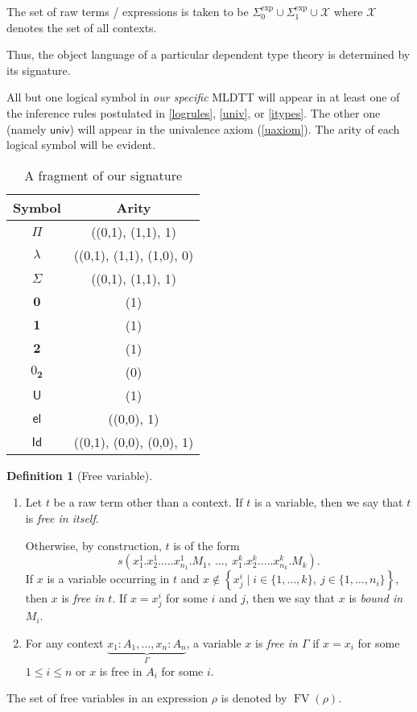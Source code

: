 \documentclass[10pt,letterpaper,cm]{nupset}
\theoremstyle{definition}
\newtheorem{definition}{Definition}[subsection]
\theoremstyle{theorem}
\theoremstyle{remark}
\newcommand{\id}{\mathsf{Id}}
\newcommand{\U}{\mathsf{U}}
\newcommand{\el}{\mathsf{el}}
\newcommand{\univv}{\mathsf{univ}}
\newcommand{\0}{\mathbf{0}}
\newcommand{\1}{\mathbf{1}}
\newcommand{\2}{\mathbf{2}}
\DeclareMathOperator{\fv}{FV}
\DeclareMathOperator{\expr}{exp}
\newcommand{\be}{\begin{enumerate}}
\newcommand{\ee}{\end{enumerate}}
\begin{document}
\medskip
The set of raw terms / expressions is taken to be $\Sigma_0^{\expr} \cup \Sigma_1^{\expr} \cup \mathcal{X}$ where $\mathcal{X}$ denotes the set of all contexts. 

\medskip

 Thus, the object language of a particular dependent type theory is determined by its signature. 
 \smallskip
 
 All but one logical symbol in \emph{our specific} MLDTT will appear in at least one of the inference rules postulated in \cref{logrules}, \cref{univ}, or \cref{itypes}. The other one (namely $\univv$) will appear in the univalence axiom (\cref{uaxiom}). The arity of each logical symbol will be evident. 

\begin{table}[h!]
\centering
\caption{A fragment of our signature}
\label{table:1}
\begin{tabular}{||c c||} 
 \hline
Symbol & Arity \\ [0.5ex] 
 \hline\hline
 $\Pi$ & ((0,1), (1,1), 1) \\
 $ \lambda$ &  ((0,1), (1,1), (1,0), 0) \\
  $\Sigma$ & ((0,1), (1,1), 1) \\
   $\0$ & (1) \\
 $\1$ & (1) \\ 
  $\2$ & (1) \\ 
   $0_{\2}$ & (0) \\  
 $\U$ & (1) \\ 
 $\el$ & ((0,0), 1) \\
 $\id$ & ((0,1), (0,0), (0,0), 1) \\ [1ex] 
 \hline
\end{tabular}
\end{table}

\begin{definition}[Free variable] $ $
\be
\item Let $t$ be a raw term other than a context. If $t$ is a variable, then we say that $t$ is \textit{free in itself}. 

Otherwise, by construction, $t$ is of the form  $$s\left(x^1_1.x^1_2.\ldots.x^1_{n_1}.M_{1},\ \ldots,\  x^k_1.x^k_2.\ldots.x^k_{n_k}.M_{k}\right)  .$$  If $x$ is a variable occurring in $t$ and $x\notin \left\{x_j^i \mid i\in \{1, \ldots, k\},\ j\in \{1, \ldots, n_i\}\right\}$, then $x$ is \textit{free in $t$}. 
If $x = x_j^i$ for some $i$ and $j$, then we say that $x$ is \textit{bound in $M_i$}.
\item For any context $\underbrace{x_1:A_1, \ldots, x_n :A_n}_{\Gamma}$, a variable $x$ is \textit{free in $\Gamma$} if  $x= x_i$ for some $1\leq i \leq n$ or $x$ is free in $A_i$ for some $i$.
\ee
The set of free variables in an expression $\rho$ is denoted by $\fv(\rho)$.
\end{definition}
\end{document}
